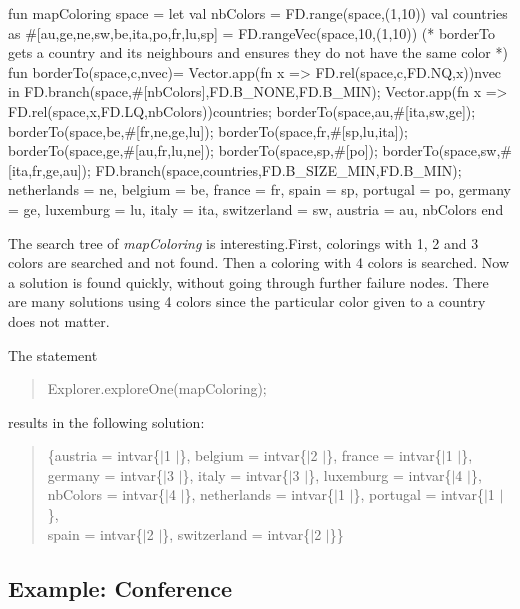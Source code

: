 \documentclass[a4paper,halfparskip]{scrartcl}
\begin{document}
\begin{myverbatim}
fun mapColoring space =
 let
    val nbColors = FD.range(space,(1,10))
    val countries as #[au,ge,ne,sw,be,ita,po,fr,lu,sp] =
            FD.rangeVec(space,10,(1,10))
    (* borderTo gets a country and its neighbours and
          ensures they do not have the same color *) 
    fun borderTo(space,c,nvec)=
                Vector.app(fn x => FD.rel(space,c,FD.NQ,x))nvec
 in
    FD.branch(space,#[nbColors],FD.B_NONE,FD.B_MIN);
    Vector.app(fn x => FD.rel(space,x,FD.LQ,nbColors))countries;
    borderTo(space,au,#[ita,sw,ge]);
    borderTo(space,be,#[fr,ne,ge,lu]);
    borderTo(space,fr,#[sp,lu,ita]);
    borderTo(space,ge,#[au,fr,lu,ne]);
    borderTo(space,sp,#[po]);
    borderTo(space,sw,#[ita,fr,ge,au]);
    FD.branch(space,countries,FD.B_SIZE_MIN,FD.B_MIN);
    { netherlands = ne, belgium = be, france = fr, spain = sp,
      portugal = po, germany = ge, luxemburg = lu, italy = ita,
      switzerland = sw, austria = au, nbColors}
 end
\end{myverbatim}


The search tree of \emph{mapColoring} is interesting.First, 
colorings with 1, 2 and 3 colors are searched and not found. 
Then a coloring with 4 colors is searched. Now a solution is 
found quickly, without going through further failure nodes. 
There are many solutions using 4 colors since the particular 
color given to a country does not matter.

The statement
\begin{quote}
Explorer.exploreOne(mapColoring);
\end{quote}
results in the following solution:
\begin{quote}
\{austria = intvar\{$|$1 $|$\}, 
 belgium = intvar\{$|$2 $|$\}, 
 france = intvar\{$|$1 $|$\}, \\
 germany = intvar\{$|$3 $|$\}, 
 italy = intvar\{$|$3 $|$\}, 
 luxemburg = intvar\{$|$4 $|$\}, \\
 nbColors = intvar\{$|$4 $|$\}, 
 netherlands = intvar\{$|$1 $|$\}, 
 portugal = intvar\{$|$1 $|$\}, \\
 spain = intvar\{$|$2 $|$\}, 
 switzerland = intvar\{$|$2 $|$\}\}
\end{quote}



\newpage
\subsection{Example: Conference}
\end{document}
